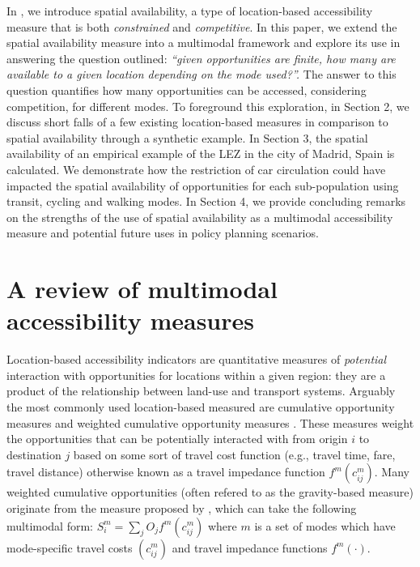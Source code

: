 \documentclass[]{trbunofficial}
\begin{document}
In \citet{soukhovIntroducingSpatialAvailability2023}, we introduce
spatial availability, a type of location-based accessibility measure
that is both \emph{constrained} and \emph{competitive}. In this paper,
we extend the spatial availability measure into a multimodal framework
and explore its use in answering the question outlined: \emph{``given
opportunities are finite, how many are available to a given location
depending on the mode used?''.} The answer to this question quantifies
how many opportunities can be accessed, considering competition, for
different modes. To foreground this exploration, in Section 2, we
discuss short falls of a few existing location-based measures in
comparison to spatial availability through a synthetic example. In
Section 3, the spatial availability of an empirical example of the LEZ
in the city of Madrid, Spain is calculated. We demonstrate how the
restriction of car circulation could have impacted the spatial
availability of opportunities for each sub-population using transit,
cycling and walking modes. In Section 4, we provide concluding remarks
on the strengths of the use of spatial availability as a multimodal
accessibility measure and potential future uses in policy planning
scenarios.

\hypertarget{a-review-of-multimodal-accessibility-measures}{%
\section{A review of multimodal accessibility
measures}\label{a-review-of-multimodal-accessibility-measures}}

Location-based accessibility indicators are quantitative measures of
\emph{potential} interaction with opportunities for locations within a
given region: they are a product of the relationship between land-use
and transport systems. Arguably the most commonly used location-based
measured are cumulative opportunity measures and weighted cumulative
opportunity measures \citep{levinsonTransportAccessManual2020}. These
measures weight the opportunities that can be potentially interacted
with from origin \(i\) to destination \(j\) based on some sort of travel
cost function (e.g., travel time, fare, travel distance) otherwise known
as a travel impedance function \(f^{m}(c^m_{ij})\). Many weighted
cumulative opportunities (often refered to as the gravity-based measure)
originate from the measure proposed by
\citet{hansenHowAccessibilityShapes1959}, which can take the following
multimodal form: \(S_i^m = \sum_j O_j f^m(c_{ij}^m)\) where \(m\) is a
set of modes which have mode-specific travel costs \((c_{ij}^m)\) and
travel impedance functions \(f^m(\cdot)\).
\end{document}

